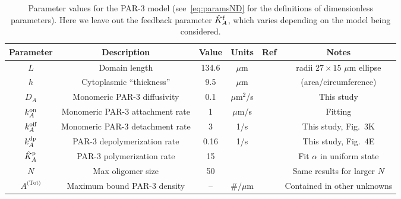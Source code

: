 \documentclass[11pt]{article}
\newcommand{\6}[1]{#1_{\text{6}}}
\newcommand{\3}[1]{#1_{\text{3}}}
\newcommand{\Tot}[1]{#1^\text{(Tot)}}
\newcommand{\A}[1]{#1_A}
\begin{document}
\begin{table}
\begin{small}
\centering
\begin{tabular}{|c|c|c|c|c|c|}\hline
Parameter & Description & Value & Units & Ref & Notes \\ \hline
$L$ & Domain length & 134.6 & $\mu$m &  \cite{goehring2011polarization} & radii $27 \times 15$ $\mu$m ellipse\\
$h$ & Cytoplasmic ``thickness'' & 9.5 & $\mu$m &  \cite{goehring2011polarization}  &  (area/circumference)\\ \hline
$\A{D} $ & Monomeric PAR-3 diffusivity & 0.1 & $\mu$m$^2$/s &  & This study \\
$\A{\kon}$ & Monomeric PAR-3 attachment rate & 1& $\mu$m/s & & Fitting \\
$k^\text{off}_{A}$ & Monomeric PAR-3 detachment rate &  3& 1/s & & This study, Fig.\ 3K\\
$\A{\kdp}$ & PAR-3 depolymerization rate & 0.16 & 1/s & & This study, Fig.\ 4E \\
$\hat{K}^\text{p}_A$ & PAR-3 polymerization rate & 15 & & & Fit $\alpha$ in uniform state  \\
$N$ & Max oligomer size & 50 & & & Same results for larger $N$\\
$\Tot{A}$ & Maximum bound PAR-3 density & -- & $\#/\mu$m & & Contained in other unknowns \\ \hline
\end{tabular}
\caption{\label{tab:paramsP3}Parameter values for the PAR-3 model (see\ \eqref{eq:paramsND} for the definitions of dimensionless parameters). Here we leave out the feedback parameter $\hat{K}^\text{f}_A$, which varies depending on the model being considered.}
\end{small}
\end{table}
\end{document}
